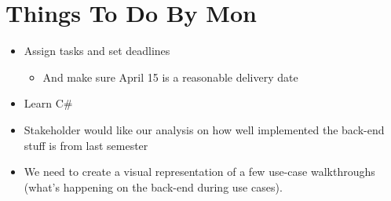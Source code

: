 \documentclass{article}
\begin{document}
\section{Things To Do By Mon}
\begin{itemize}
\item Assign tasks and set deadlines
	\begin{itemize}
	\item And make sure April 15 is a reasonable delivery date
	\end{itemize}
\item Learn C\#
\item Stakeholder would like our analysis on how well implemented the back-end stuff is from last semester
\item We need to create a visual representation of a few use-case walkthroughs (what's happening on the back-end during use cases). 
\end{itemize}
\end{document}
